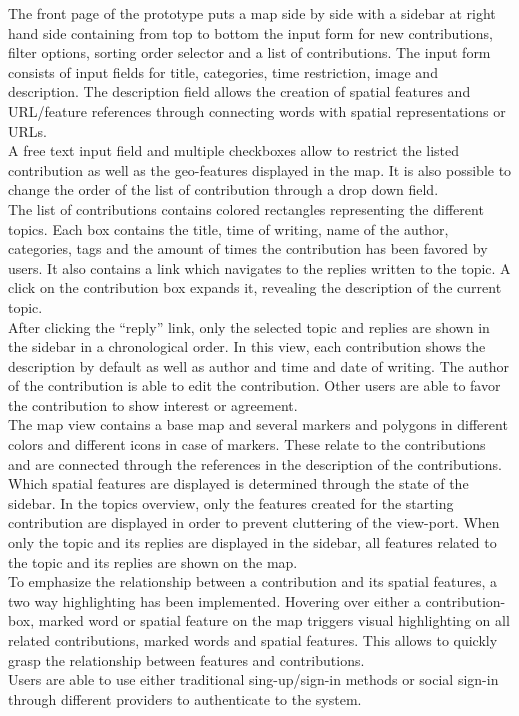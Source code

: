 \documentclass{sigchi}
\begin{document}
The front page of the prototype puts a map side by side with a sidebar at right hand side containing from top to bottom the input form for new contributions, filter options, sorting order selector and a list of contributions. The input form consists of input fields for title, categories, time restriction, image and description. The description field allows the creation of spatial features and URL/feature references through connecting words with spatial representations or URLs.\\
A free text input field and multiple checkboxes allow to restrict the listed contribution as well as the geo-features displayed in the map. It is also possible to change the order of the list of contribution through a drop down field.\\
The list of contributions contains colored rectangles representing the different topics. Each box contains the title, time of writing, name of the author, categories, tags and the amount of times the contribution has been favored by users. It also contains a link which navigates to the replies written to the topic. A click on the contribution box expands it, revealing the description of the current topic.\\
After clicking the ``reply'' link, only the selected topic and replies are shown in the sidebar in a chronological order. In this view, each contribution shows the description by default as well as author and time and date of writing. The author of the contribution is able to edit the contribution. Other users are able to favor the contribution to show interest or agreement.\\
The map view contains a base map and several markers and polygons in different colors and different icons in case of markers. These relate to the contributions and are connected through the references in the description of the contributions. Which spatial features are displayed is determined through the state of the sidebar. In the topics overview, only the features created for the starting contribution are displayed in order to prevent cluttering of the view-port. When only the topic and its replies are displayed in the sidebar, all features related to the topic and its replies are shown on the map.\\
To emphasize the relationship between a contribution and its spatial features, a two way highlighting has been implemented. Hovering over either a contribution-box, marked word or spatial feature on the map triggers visual highlighting on all related contributions, marked words and spatial features. This allows to quickly grasp the relationship between features and contributions.\\
Users are able to use either traditional sing-up/sign-in methods or social sign-in through different providers to authenticate to the system.
\end{document}
